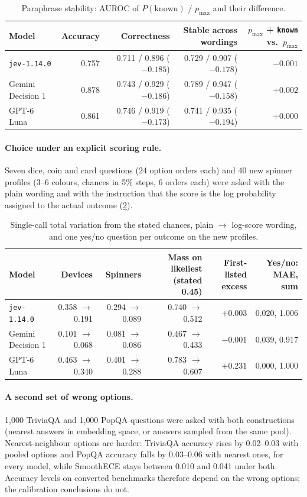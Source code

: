 \documentclass[10pt,twocolumn]{article}
\newcommand{\pmax}{p_{\max}}
\begin{document}
\begin{table}[h]
\centering\small
\caption{Paraphrase stability: AUROC of $P(\text{known})$ / $\pmax$ and
their difference.}
\label{tab:para}
\begin{tabular}{@{}l r r r r@{}}
\toprule
Model & Accuracy & Correctness & Stable across wordings & $\pmax$ + \texttt{known} vs.\ $\pmax$ \\
\midrule
\texttt{jev-1.14.0} & 0.757 & 0.711 / 0.896 ($-0.185$) & 0.729 / 0.907 ($-0.178$) & $-0.001$ \\
Gemini Decision 1 & 0.878 & 0.743 / 0.929 ($-0.186$) & 0.789 / 0.947 ($-0.158$) & $+0.002$ \\
GPT-6 Luna & 0.861 & 0.746 / 0.919 ($-0.173$) & 0.741 / 0.935 ($-0.194$) & $+0.000$ \\
\bottomrule
\end{tabular}
\end{table}

\paragraph{Choice under an explicit scoring rule.} Seven dice, coin and card
questions (24 option orders each) and 40 new spinner profiles (3--6
colours, chances in 5\% steps, 6 orders each) were asked with the plain
wording and with the instruction that the score is the log probability
assigned to the actual outcome (\cref{tab:logscore}).

\begin{table}[h]
\centering\small
\caption{Single-call total variation from the stated chances, plain $\to$
log-score wording, and one yes/no question per outcome on the new
profiles.}
\label{tab:logscore}
\begin{tabular}{@{}l r r r r r@{}}
\toprule
Model & Devices & Spinners & Mass on likeliest (stated 0.45) & First-listed excess & Yes/no: MAE, sum \\
\midrule
\texttt{jev-1.14.0} & 0.358 $\to$ 0.191 & 0.294 $\to$ 0.089 & 0.740 $\to$ 0.512 & $+0.003$ & 0.020, 1.006 \\
Gemini Decision 1 & 0.101 $\to$ 0.068 & 0.081 $\to$ 0.086 & 0.467 $\to$ 0.433 & $-0.001$ & 0.039, 0.917 \\
GPT-6 Luna & 0.463 $\to$ 0.340 & 0.401 $\to$ 0.288 & 0.783 $\to$ 0.607 & $+0.231$ & 0.000, 1.000 \\
\bottomrule
\end{tabular}
\end{table}

\paragraph{A second set of wrong options.} 1{,}000 TriviaQA and 1{,}000 PopQA
questions were asked with both constructions (nearest answers in embedding
space, or answers sampled from the same pool). Nearest-neighbour options are
harder: TriviaQA accuracy rises by 0.02--0.03 with pooled options and PopQA
accuracy falls by 0.03--0.06 with nearest ones, for every model, while
SmoothECE stays between 0.010 and 0.041 under both. Accuracy levels on
converted benchmarks therefore depend on the wrong options; the calibration
conclusions do not.
\end{document}
